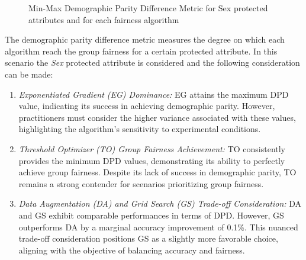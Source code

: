 \begin{figure}[H]
    \centering
    \caption{Min-Max Demographic Parity Difference Metric for Sex protected attributes and for each fairness algorithm}
\end{figure}

The demographic parity difference metric measures the degree on which each algorithm reach the group fairness for a certain protected attribute. In this scenario the \emph{Sex} protected attribute is considered and the following consideration can be made:

\begin{enumerate}
    \item \emph{Exponentiated Gradient (EG) Dominance:} EG attains the maximum DPD value, indicating its success in achieving demographic parity. However, practitioners must consider the higher variance associated with these values, highlighting the algorithm's sensitivity to experimental conditions.

    \item \emph{Threshold Optimizer (TO) Group Fairness Achievement:} TO consistently provides the minimum DPD values, demonstrating its ability to perfectly achieve group fairness. Despite its lack of success in demographic parity, TO remains a strong contender for scenarios prioritizing group fairness.

    \item \emph{Data Augmentation (DA) and Grid Search (GS) Trade-off Consideration:} DA and GS exhibit comparable performances in terms of DPD. However, GS outperforms DA by a marginal accuracy improvement of 0.1\%. This nuanced trade-off consideration positions GS as a slightly more favorable choice, aligning with the objective of balancing accuracy and fairness.
\end{enumerate}

